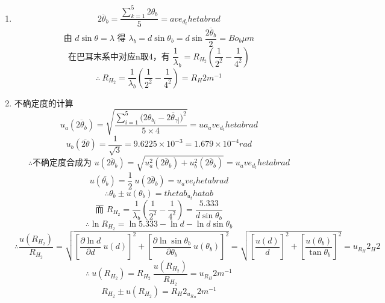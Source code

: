 \begin{enumerate}
  \item { }
      $$\overline{2{\theta}_b} = \displaystyle\frac{\sum_{k=1}^5 2{\theta}_b}{5} = {{ave_d_thetab}}rad$$
      $$\displaystyle\text{由\ }d\sin{\theta} = {\lambda}\text{\ 得\ }{\lambda}_b = d\sin{\theta}_b = d\sin{\frac{\overline{2{\theta}_b}}{2}} = {{Bo_b}}\mu m $$
      $$\displaystyle\text{在巴耳末系中对应n取4，有\ }\frac{1}{\lambda}_b = R_{H_2}\left(\frac{1}{2^2}-\frac{1}{4^2}\right)$$
      $$\therefore\ \displaystyle R_{H_2} = \frac{1}{ {\lambda}_b}\left(\frac{1}{2^2}-\frac{1}{4^2}\right) = {{R_H2}}m^{-1}$$
  \item {不确定度的计算}
      $$u_a(\overline{2{\theta}_b}) = \displaystyle\sqrt{\frac{\sum_{i=1}^5{(2{\theta}_{b_{i}}-\overline{2{\theta}_{\gamma]}}})^2}{5\times4}}={{ua_ave_d_thetab}}rad$$
      $$u_b(\overline{2\theta}) = \displaystyle\frac{1}{\sqrt3} = 9.6225\times10^{-3} = 1.679 \times 10^{-4} rad$$
      $$\therefore\text{不确定度合成为\ }u(\overline{2{\theta}_b}) = \sqrt{u_a^2(\overline{2{\theta}_b})+u_b^2(\overline{2{\theta}_b})} = {{u_ave_d_thetab}}rad$$
      $$u(\overline{ {\theta}_b})= \displaystyle\frac12\ u(\overline{2{\theta}_b}) = {{u_ave_thetab}}rad$$
      $$\therefore{\theta}_b \pm u({\theta}_b) = {{thetab_u_thatab}}$$
      $$\text{而\ }\displaystyle R_{H_2} = \frac{1}{ {\lambda}_b}\left(\frac{1}{2^2}-\frac{1}{4^2}\right) = \frac{5.333}{d\sin{\theta}_b}$$
      $$\therefore\ln{R_{H_2}} = \ln{5.333} -\ln{d} - \ln{d\sin{\theta}_b}$$
      $$\therefore\displaystyle \frac{u(R_{H_2})}{R_{H_2}} = \sqrt{ {\left[\frac{\partial{\ln{d}}}{\partial{d}}\ u(d)\right]}^2 + {\left[\frac{\partial{\ln{\sin{ {\theta}_b}}}}{\partial{ {\theta}_b}}\ u({\theta}_b)\right]}^2} = \sqrt{ {\left[\frac{u(d)}{d}\right]}^2 + {\left[\frac{u({\theta}_b)}{\tan{ {\theta}_b}}\right]}^2} = {{u_R_H2_H2}}$$
      $$\therefore \ u(R_{H_2}) = \displaystyle R_{H_2}\ \frac{u(R_{H_2})}{R_{H_2}} = {{u_R_H2}}m^{-1}$$ 
      $$R_{H_2} \pm u(R_{H_2}) = {{R_H2_u_R_H2}}m^{-1}$$
\end{enumerate}

